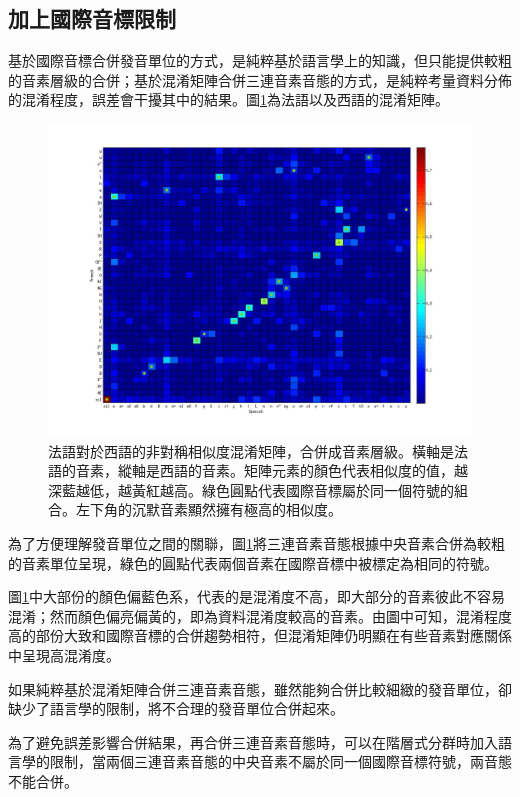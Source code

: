 \subsection{加上國際音標限制}
基於國際音標合併發音單位的方式，是純粹基於語言學上的知識，但只能提供較粗的音素層級的合併；基於混淆矩陣合併三連音素音態的方式，是純粹考量資料分佈的混淆程度，誤差會干擾其中的結果。圖\ref{fig:chap4_CM_IPA}為法語以及西語的混淆矩陣。

\begin{figure}[!h]
\centering
\includegraphics[scale=0.3]{images/chap4_CM_IPA}
\caption{法語對於西語的非對稱相似度混淆矩陣，合併成音素層級。橫軸是法語的音素，縱軸是西語的音素。矩陣元素的顏色代表相似度的值，越深藍越低，越黃紅越高。綠色圓點代表國際音標屬於同一個符號的組合。左下角的沉默音素顯然擁有極高的相似度。}
\label{fig:chap4_CM_IPA}
\end{figure}

為了方便理解發音單位之間的關聯，圖\ref{fig:chap4_CM_IPA}將三連音素音態根據中央音素合併為較粗的音素單位呈現，綠色的圓點代表兩個音素在國際音標中被標定為相同的符號。

圖\ref{fig:chap4_CM_IPA}中大部份的顏色偏藍色系，代表的是混淆度不高，即大部分的音素彼此不容易混淆；然而顏色偏亮偏黃的，即為資料混淆度較高的音素。由圖中可知，混淆程度高的部份大致和國際音標的合併趨勢相符，但混淆矩陣仍明顯在有些音素對應關係中呈現高混淆度。

如果純粹基於混淆矩陣合併三連音素音態，雖然能夠合併比較細緻的發音單位，卻缺少了語言學的限制，將不合理的發音單位合併起來。

為了避免誤差影響合併結果，再合併三連音素音態時，可以在階層式分群時加入語言學的限制，當兩個三連音素音態的中央音素不屬於同一個國際音標符號，兩音態不能合併。


